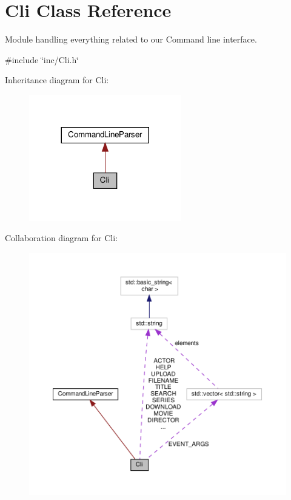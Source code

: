 \hypertarget{classCli}{}\section{Cli Class Reference}
\label{classCli}


Module handling everything related to our Command line interface.  




{\ttfamily \#include \char`\"{}inc/\+Cli.\+h\char`\"{}}



Inheritance diagram for Cli\+:\nopagebreak
\begin{figure}[H]
\begin{center}
\leavevmode
\includegraphics[width=188pt]{classCli__inherit__graph}
\end{center}
\end{figure}


Collaboration diagram for Cli\+:\nopagebreak
\begin{figure}[H]
\begin{center}
\leavevmode
\includegraphics[width=350pt]{classCli__coll__graph}
\end{center}
\end{figure}
